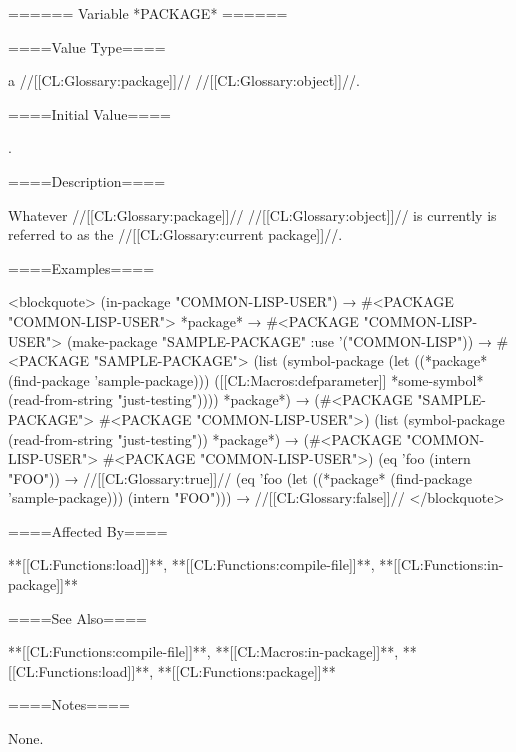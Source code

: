 ====== Variable *PACKAGE* ======

====Value Type====

a //[[CL:Glossary:package]]// //[[CL:Glossary:object]]//.

====Initial Value====

.

====Description====

Whatever //[[CL:Glossary:package]]// //[[CL:Glossary:object]]// is currently  is referred to as the //[[CL:Glossary:current package]]//.

====Examples====

<blockquote> (in-package "COMMON-LISP-USER") → #<PACKAGE "COMMON-LISP-USER"> *package* → #<PACKAGE "COMMON-LISP-USER"> (make-package "SAMPLE-PACKAGE" :use '("COMMON-LISP")) → #<PACKAGE "SAMPLE-PACKAGE"> (list (symbol-package (let ((*package* (find-package 'sample-package))) ([[CL:Macros:defparameter]] *some-symbol* (read-from-string "just-testing")))) *package*) → (#<PACKAGE "SAMPLE-PACKAGE"> #<PACKAGE "COMMON-LISP-USER">) (list (symbol-package (read-from-string "just-testing")) *package*) → (#<PACKAGE "COMMON-LISP-USER"> #<PACKAGE "COMMON-LISP-USER">) (eq 'foo (intern "FOO")) → //[[CL:Glossary:true]]// (eq 'foo (let ((*package* (find-package 'sample-package))) (intern "FOO"))) → //[[CL:Glossary:false]]// </blockquote>

====Affected By====

**[[CL:Functions:load]]**, **[[CL:Functions:compile-file]]**, **[[CL:Functions:in-package]]**

====See Also====

**[[CL:Functions:compile-file]]**, **[[CL:Macros:in-package]]**, **[[CL:Functions:load]]**, **[[CL:Functions:package]]**

====Notes====

None.

